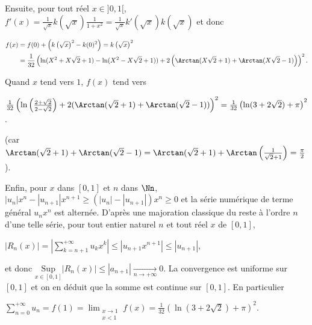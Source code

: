 {{Ensuite, pour tout réel $x\in]0,1[$, $f'(x) =\frac{1}{\sqrt{x}}k\left(\sqrt{x}\right)\frac{1}{1+x^2}=\frac{1}{\sqrt{x}}k'\left(\sqrt{x}\right)k\left(\sqrt{x}\right)$ et donc 

\begin{align*}\ensuremath
f(x)&=f(0)+\left(k\left(\sqrt{x}\right)^2 -k(0)^2\right)=k\left(\sqrt{x}\right)^2\\
 &=\frac{1}{32}\left(\ln(X^2+X\sqrt{2}+1)-\ln(X^2-X\sqrt{2}+1))+2\left(\Arctan(X\sqrt{2}+1)+\Arctan(X\sqrt{2}-1)\right)\right)^2.
\end{align*}

Quand $x$ tend vers $1$, $f(x)$ tend vers 

\begin{center}
$\frac{1}{32}
\left(\ln\left(\frac{2+\sqrt{2}}{2-\sqrt{2}}\right)+ 2 (\Arctan (\sqrt{2}+1)+\Arctan(\sqrt{2}-1))\right)^2=  \frac{1}{32}\left(\ln(3+2\sqrt{2}) +\pi\right)^2$.
\end{center}

(car $\Arctan (\sqrt{2}+1)+\Arctan(\sqrt{2}-1)=\Arctan (\sqrt{2}+1)+\Arctan\left(\frac{1}{\sqrt{2}+1}\right)=\frac{\pi}{2}$).

Enfin, pour $x$ dans $[0,1]$ et $n$ dans $\Nn$, $|u_n|x^n - |u_{n+1}|x^{n+1}\geqslant(|u_n| - |u_{n+1}|)x^n\geqslant 0$ et la série numérique de terme général $u_nx^n$ est alternée. D'après une majoration classique du reste à l'ordre $n$ d'une telle série, pour tout entier naturel $n$ et tout réel $x$ de $[0,1]$,

\begin{center}
$|R_n(x)|=\left|\sum_{k=n+1}^{+\infty}u_kx^k\right|\leqslant\left|u_{n+1}x^{n+1}\right|\leqslant |u_{n+1}|$,
\end{center}

et donc $\underset{x\in[0,1]}{\text{Sup}}|R_n(x)|\leqslant|a_{n+1}|\underset{n\rightarrow+\infty}{\rightarrow}0$. La convergence est uniforme sur $[0,1]$ et on en déduit que la somme est continue sur $[0,1]$. En particulier 

\begin{center}
$\sum_{n=0}^{+\infty}u_n=f(1)=\displaystyle\lim_{\substack{x\rightarrow1\\ x<1}}f(x)=\frac{1}{32}\left(\ln(3+2\sqrt{2}) +\pi\right)^2$.
\end{center}

\begin{center}
\end{center}
}
}
